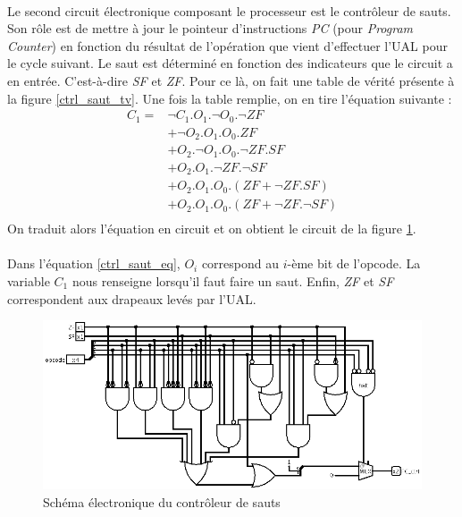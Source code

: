 \paragraph{}{
	Le second circuit électronique composant le processeur est
	le contrôleur de sauts. Son rôle est de mettre à jour le pointeur
	d'instructions \textit{PC} (pour \textit{Program Counter})
	en fonction du résultat de l'opération que vient d'effectuer
	l'UAL pour le cycle suivant. Le saut est déterminé en fonction
	des indicateurs que le circuit a en entrée. C'est-à-dire 
	\textit{SF} et \textit{ZF}. Pour ce là, on fait une table de
	vérité présente à la figure \ref{ctrl_saut_tv}. Une 
	fois la	table remplie, on en tire l'équation suivante :
	\begin{equation}
		\label{ctrl_saut_eq}
		\begin{split}
		C_{1} = & \neg C_{1} . O_{1} . \neg O_{0} . \neg{ZF} \\
				& + \neg O_{2} . O_{1} . O_{0} .  {ZF} \\
				& + O_{2} . \neg O_{1} . O_{0} . \neg{ZF} . {SF} \\
				& + O_{2} . O_{1} . \neg{ZF} . \neg{SF} \\
				& + O_{2} . O_{1} . O_{0} . ( {ZF} + \neg{ZF} . {SF}) \\
				& + O_{2} . O_{1} . O_{0} . ( {ZF} + \neg{ZF} . \neg{SF} ) \\
		\end{split}
	\end{equation}
	On traduit alors l'équation en circuit et on obtient le circuit
	de la figure \ref{control_saut_circ}.
}

\paragraph{}{
	Dans l'équation \ref{ctrl_saut_eq}, $O_{i}$ correspond au $i$-ème
	bit de l'opcode. La variable $C_{1}$ nous renseigne lorsqu'il faut faire un saut.
	Enfin, \textit{ZF} et \textit{SF} correspondent aux drapeaux levés par l'UAL.
}

\begin{figure}[!ht]
	\centering
	\includegraphics[scale=0.4,origin=c]{circuits/control_saut.png}
	\caption{
		\label{control_saut_circ}
		Sch\'{e}ma \'{e}lectronique du contr\^{o}leur de sauts
	}
\end{figure}

